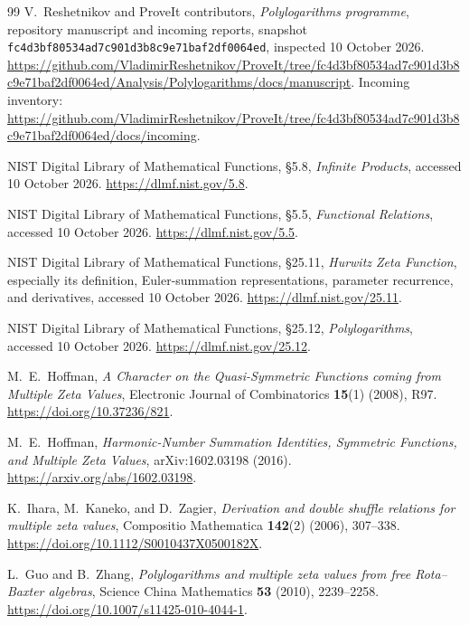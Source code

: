 \documentclass[11pt]{article}
\numberwithin{equation}{section}
\theoremstyle{definition}\newtheorem{definition}[theorem]{Definition}
\theoremstyle{remark}\newtheorem{remark}[theorem]{Remark}
\newcommand{\pin}{\texttt{fc4d3bf80534ad7c901d3b8c9e71baf2df0064ed}}
\begin{document}
\begin{thebibliography}{99}
V.~Reshetnikov and ProveIt contributors,
\emph{Polylogarithms programme}, repository manuscript and
incoming reports, snapshot \pin, inspected 10 October 2026.
\url{https://github.com/VladimirReshetnikov/ProveIt/tree/fc4d3bf80534ad7c901d3b8c9e71baf2df0064ed/Analysis/Polylogarithms/docs/manuscript}.
Incoming inventory:
\url{https://github.com/VladimirReshetnikov/ProveIt/tree/fc4d3bf80534ad7c901d3b8c9e71baf2df0064ed/docs/incoming}.

NIST Digital Library of Mathematical Functions,
\S5.8, \emph{Infinite Products}, accessed 10 October 2026.
\url{https://dlmf.nist.gov/5.8}.

NIST Digital Library of Mathematical Functions,
\S5.5, \emph{Functional Relations}, accessed 10 October 2026.
\url{https://dlmf.nist.gov/5.5}.

NIST Digital Library of Mathematical Functions,
\S25.11, \emph{Hurwitz Zeta Function}, especially its definition,
Euler-summation representations, parameter recurrence, and derivatives,
accessed 10 October 2026.
\url{https://dlmf.nist.gov/25.11}.

NIST Digital Library of Mathematical Functions,
\S25.12, \emph{Polylogarithms}, accessed 10 October 2026.
\url{https://dlmf.nist.gov/25.12}.

M.~E.~Hoffman,
\emph{A Character on the Quasi-Symmetric Functions coming from Multiple Zeta Values},
Electronic Journal of Combinatorics \textbf{15}(1) (2008), R97.
\url{https://doi.org/10.37236/821}.

M.~E.~Hoffman,
\emph{Harmonic-Number Summation Identities, Symmetric Functions, and Multiple Zeta Values},
arXiv:1602.03198 (2016).
\url{https://arxiv.org/abs/1602.03198}.

K.~Ihara, M.~Kaneko, and D.~Zagier,
\emph{Derivation and double shuffle relations for multiple zeta values},
Compositio Mathematica \textbf{142}(2) (2006), 307--338.
\url{https://doi.org/10.1112/S0010437X0500182X}.

L.~Guo and B.~Zhang,
\emph{Polylogarithms and multiple zeta values from free Rota--Baxter algebras},
Science China Mathematics \textbf{53} (2010), 2239--2258.
\url{https://doi.org/10.1007/s11425-010-4044-1}.
\end{thebibliography}
\end{document}
